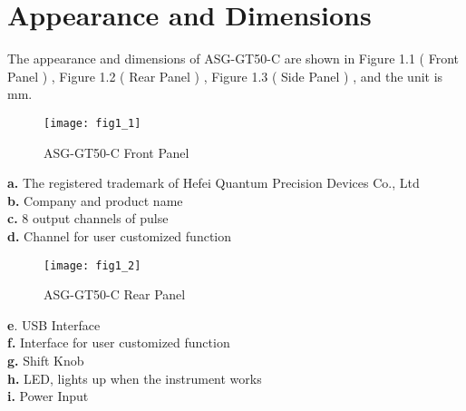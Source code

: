 \section{\heiti Appearance and Dimensions}
The appearance and dimensions of ASG-GT50-C are shown in Figure 1.1 ( Front Panel ) , Figure 1.2 ( Rear Panel ) , Figure 1.3 ( Side Panel ) , and the unit is mm.
\begin{figure}[ht]
\centering
\texttt{[image: fig1\_1]}
\caption{\hspace{0.3cm}ASG-GT50-C Front Panel}\label{fig:fig1_1}
\end{figure}


\noindent \textbf{a.} The registered trademark of Hefei Quantum Precision Devices Co., Ltd\\
\textbf{b.} Company and product name\\
\textbf{c.} 8 output channels of pulse\\
\textbf{d.} Channel for user customized function


\begin{figure}[ht]
\centering
\texttt{[image: fig1\_2]}
\caption{\hspace{0.3cm}ASG-GT50-C Rear Panel}\label{fig:fig1_2}
\end{figure}

\noindent \textbf{e}. USB Interface\\
\textbf{f.} Interface for user customized function\\
\textbf{g.} Shift Knob\\
\textbf{h.} LED, lights up when the instrument works\\
\textbf{i.} Power Input

